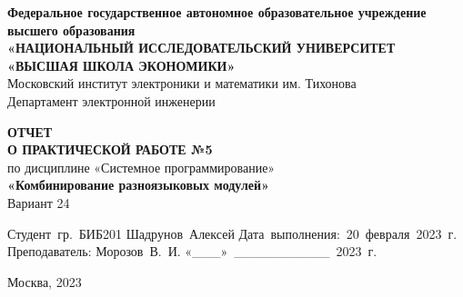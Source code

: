 \begin{titlepage}
        \begin{center}

            \timesfont
            {\large\bf\timesfont Федеральное‌ ‌государственное‌ ‌автономное‌ ‌образовательное‌ ‌учреждение‌ ‌высшего‌ образования\\}
            {\large\bf\timesfont «НАЦИОНАЛЬНЫЙ‌ ‌ИССЛЕДОВАТЕЛЬСКИЙ‌ ‌УНИВЕРСИТЕТ‌ «ВЫСШАЯ‌ ‌ШКОЛА‌ ‌ЭКОНОМИКИ»‌\\}
            Московский‌ ‌институт‌ ‌электроники‌ ‌и‌ ‌математики‌ ‌им. Тихонова‌\\
            Департамент‌ ‌электронной‌ ‌инженерии‌\\

            \vfill
            \vfill

            {\bf\timesfont ОТЧЕТ \\
                О ПРАКТИЧЕСКОЙ РАБОТЕ №5}\\
            по дисциплине «Системное программирование»\\
            {\bf\timesfont «Комбинирование разноязыковых модулей»}\\
            Вариант 24\\


            \vfill
            \vfill
            \vfill

            \hfill\vbox
            {
                \hbox{Студент гр. БИБ201}
                \hbox{Шадрунов Алексей}
                \hbox{Дата выполнения: 20 февраля 2023 г.}
                \hbox{}
                \hbox{Преподаватель:}
                \hbox{Морозов В. И.}
                \hbox{«\_\_\_» \_\_\_\_\_\_\_\_\_\_ 2023 г.}
            }

            \vfill

            Москва, 2023
        \end{center}
\end{titlepage}
